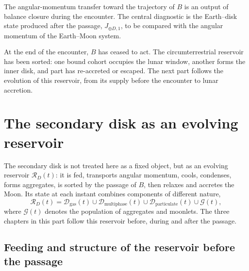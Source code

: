 \documentclass[11pt,a4paper,openany]{report}
\newcommand{\RD}{\mathcal{R}_{D}}
\begin{document}
\begin{controle}
The angular-momentum transfer toward the trajectory of $B$ is an output of balance closure during
the encounter. The central diagnostic is the Earth--disk state produced after the passage,
$J_{\oplus D,1}$, to be compared with the angular momentum of the Earth--Moon system.
\end{controle}


\begin{rappel}
At the end of the encounter, $B$ has ceased to act. The circumterrestrial reservoir has been
sorted: one bound cohort occupies the lunar window, another forms the inner disk, and part has
re-accreted or escaped. The next part follows the evolution of this reservoir, from its supply
before the encounter to lunar accretion.
\end{rappel}

\part{The secondary disk as an evolving reservoir}
\label{part:reservoir}

\noindent
The secondary disk is not treated here as a fixed object, but as an evolving reservoir $\RD(t)$: it
is fed, transports angular momentum, cools, condenses, forms aggregates, is sorted by the passage
of $B$, then relaxes and accretes the Moon. Its state at each instant combines components of
different nature,
\begin{equation}
\RD(t)=\mathcal{D}_{\mathrm{gas}}(t)\cup\mathcal{D}_{\mathrm{multiphase}}(t)\cup
\mathcal{D}_{\mathrm{particulate}}(t)\cup\mathcal{G}(t),
\label{eq:RD}
\end{equation}
where $\mathcal{G}(t)$ denotes the population of aggregates and moonlets. The three chapters in
this part follow this reservoir before, during and after the passage.

\chapter{Feeding and structure of the reservoir before the passage}
\label{ch:structure}
\end{document}
